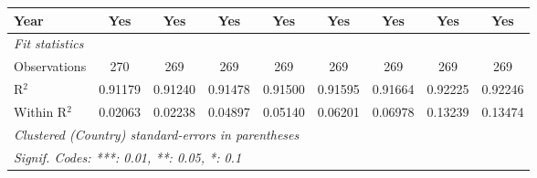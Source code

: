 \begin{table}[htbp]
\begin{tabular}{lcccccccc}
      Year                                      & Yes            & Yes           & Yes            & Yes           & Yes            & Yes            & Yes            & Yes\\  
      \midrule
      \emph{Fit statistics}\\
      Observations                              & 270            & 269           & 269            & 269           & 269            & 269            & 269            & 269\\  
      R$^2$                                     & 0.91179        & 0.91240       & 0.91478        & 0.91500       & 0.91595        & 0.91664        & 0.92225        & 0.92246\\  
      Within R$^2$                              & 0.02063        & 0.02238       & 0.04897        & 0.05140       & 0.06201        & 0.06978        & 0.13239        & 0.13474\\  
      \midrule \midrule
      \multicolumn{9}{l}{\emph{Clustered (Country) standard-errors in parentheses}}\\
      \multicolumn{9}{l}{\emph{Signif. Codes: ***: 0.01, **: 0.05, *: 0.1}}\\
   \end{tabular}
\end{table}



